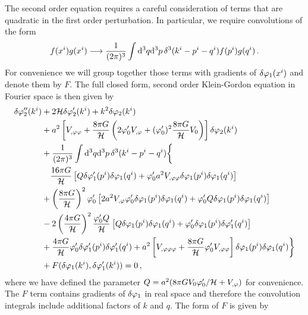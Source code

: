 The second order equation requires a careful
consideration of terms that are quadratic in the first order perturbation. In
particular, we
require convolutions of the form
%
\begin{equation}
 f(x^i)g(x^i) \longrightarrow \frac{1}{(2 \pi)^3} \int \mathrm{d}^3q \mathrm{d}^3p\, \delta^3(k^i
-p^i -q^i) f(p^i)
g(q^i) \,.
\end{equation}
%
For convenience we will group together those terms with gradients of $\delta\varphi_{1}(x^i)$
and denote them by $F$. 
The full closed form, second order Klein-Gordon
equation in Fourier space is then given by \cite{Malik:2006ir}
%  
\begin{align}
\label{eq:SOKG-real-num}
\dvp2''(\kvi) &+ 2\H \dvp2'(\kvi) + k^2 \dvp2(\kvi) \nonumber \\
%
&+ a^2\left[\Upp + \frac{8\pi G}{\H}\left(2\vp_{0}'\Uphi
+ (\vp_0')^2\frac{8\pi G}{\H}\U \right) \right]\dvp2(\kvi) \nonumber \\
% 
&+ \frac{1}{(2\pi)^3}\int \d^3q \d^3p\, \delta^3(\kvi -\pvi -\qvi) \biggl\{
\biggr.\nonumber\\
&\quad \frac{16\pi G}{\H} \left[ Q \dvp1'(\pvi) \dvp1(\qvi) + \vp_{0}' a^2\Upp
\dvp1(\pvi)\dvp1(\qvi) \right]  \nonumber \\
%
&+ \left(\frac{8\pi G}{\H}\right)^2\vp_{0}'\left[2a^2\Uphi\vp_{0}'
\dvp1(\pvi)\dvp1(\qvi) + \vp_{0}'Q\dvp1(\pvi)\dvp1(\qvi) \right]
\nonumber \\
%
&- 2\left(\frac{4\pi G}{\H}\right)^2\frac{\vp_{0}' Q}{\H} \left[Q\dvp1(\pvi)
\dvp1(\qvi) +
\vp_{0}' \dvp1(\pvi) \dvp1'(\qvi)\right] \nonumber \\
%
\biggl. &+ \frac{4\pi G}{\H} \vp_{0}' \dvp1'(\pvi) \dvp1'(\qvi) 
 + a^2\left[\Uppp + \frac{8\pi G}{\H}\vp_{0}' \Upp\right] \dvp1(\pvi)
\dvp1(\qvi) \biggr\} \nonumber \\
&+ F(\dvp1(\kvi), \dvp1'(\kvi)) = 0\,,
\end{align}
%
where we have defined the parameter $Q=a^2 (8\pi G V_{0} \varphi_0'/\mathcal{H} + V_{,\varphi})$ for
convenience.
The $F$ term contains gradients of $\delta\varphi_{1}$ in real space and therefore
the convolution integrals include additional factors of $k$ and
$q$. The form of $F$ is given by \cite{Malik:2006ir}
%
